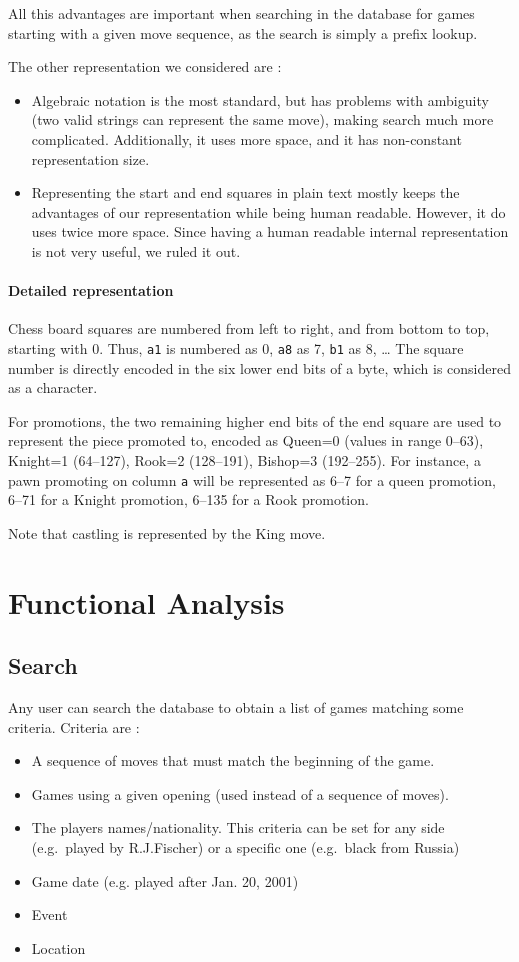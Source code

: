 \documentclass{article}
\begin{document}
All this advantages are important when searching in the database for games starting
with a given move sequence, as the search is simply a prefix lookup.

The other representation we considered are :
\begin{itemize}
\item Algebraic notation is the most standard, but has problems with ambiguity
(two valid strings can represent the same move), making search much more complicated.
Additionally, it uses more space, and it has non-constant representation size.

\item Representing the start and end squares in plain text mostly keeps the advantages
of our representation while being human readable. However, it do uses twice more space.
Since having a human readable internal representation is not very useful,
we ruled it out.
\end{itemize}


\paragraph{Detailed representation}
Chess board squares are numbered from left to right, and from bottom to top,
starting with 0. Thus, \verb|a1| is numbered as 0, \verb|a8| as 7, \verb|b1| as 8, \dots
The square number is directly encoded in the six lower end bits of a byte, which is considered as a character.

For promotions, the two remaining higher end bits of the end square are used to represent the piece promoted to,
encoded as Queen=0 (values in range 0--63), Knight=1 (64--127), Rook=2 (128--191), Bishop=3 (192--255).
For instance, a pawn promoting on column \verb|a| will be represented as 6--7 for a queen promotion,
6--71 for a Knight promotion, 6--135 for a Rook promotion.

Note that castling is represented by the King move.


\section{Functional Analysis}
\subsection{Search}
Any user can search the database to obtain a list of games matching some criteria.
Criteria are :
\begin{itemize}[noitemsep]
\item A sequence of moves that must match the beginning of the game.
\item Games using a given opening (used instead of a sequence of moves).
\item The players names/nationality. This criteria can be set for any side
(e.g.\ played by R.J.Fischer) or a specific one (e.g.\ black from Russia)
\item Game date (e.g. played after Jan. 20, 2001)
\item Event
\item Location
\end{itemize}
\end{document}
